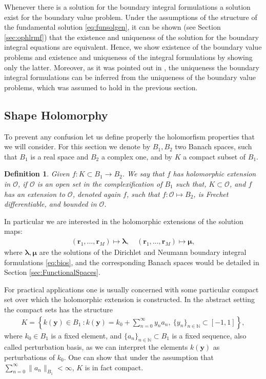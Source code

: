 \documentclass{article}
\newtheorem{definition}[theorem]{Definition}
\newcommand{\cO}{\mathcal O}
\newcommand{\bmu} {\bm{\mu}}
\newcommand{\IN}{{\mathbb N}}
\newcommand{\bla}{\boldsymbol \lambda}
\newcommand{\br}{\bm{r}}
\newcommand{\by}{\bm{y}}
\begin{document}
Whenever there is a solution for the boundary integral formulations a solution exist for the boundary value problem. Under the assumptions of the 
structure of the fundamental solution \eqref{eq:funsolgen}, it can be shown (see Section \ref{sec:ophlrmf}) that the existence and uniqueness of the solution for the boundary integral equations are equivalent. Hence, we show existence of the boundary value problems and  existence and uniqueness of the integral formulations by showing only  the latter. Moreover, as it was pointed out in \cite{JHP20}, the uniqueness the boundary integral formulations can be inferred from the uniqueness of the boundary value problems, which was assumed to hold in the previous section. 

\subsection{Shape Holomorphy}
\label{section:ShapeHolormsGeneral}

To prevent any confusion let us define properly the holomorfism properties that we will consider. For this section we denote by $B_1,B_2$ two Banach spaces, such that $B_1$ is a real space and $B_2$ a complex one, and by $K$ a compact subset of $B_1$. 

\begin{definition}
\label{def:holmrfextension}
Given $f :K \subset B_1 \rightarrow B_2$. We say that $f$ has holomorphic extension in $\cO$, if $\cO$ is an open set in the complexification of $B_1$ such that, $K \subset \cO$, and $f$ has an extension to $\cO$, denoted again $f$, such that $f : \cO \mapsto B_2$, is Frechet differentiable, and bounded in $\cO$.
\end{definition}

In particular we are interested in the holomorphic extensions of the solution maps: 
\begin{align*}
(\br_1,\hdots,\br_M) \mapsto \bla, \quad (\br_1,\hdots,\br_M) \mapsto \bmu,
\end{align*}
where $\bla,\bmu$ are the solutions of the Dirichlet and Neumann boundary integral formulations \eqref{eq:bios}, and the corresponding Banach spaces would be detailed in Section \ref{sec:FunctionalSpaces}.

For practical applications one is usually concerned with some particular compact set over which the holomorphic extension is constructed. In the abstract setting the compact sets has the structure 
\begin{align}
\label{eq:Kcompact}
K =\left\lbrace k(\by) \in B_1 \ : k(\by) = k_0 + \sum_{n=0}^\infty y_n a_n, \ \{y_n\}_{n \in \IN} \subset [-1,1] \right\rbrace,
\end{align}
where $k_0 \in B_1$ is a fixed element, and $\{a_n\}_{n\in \IN} \subset B_1$ is  a fixed sequence, also called perturbation basis, as we can interpret the elements $k(\by)$ as perturbations of $k_0$. One can show that under the assumption that $\sum_{n=0}^\infty \|a_n\|_{B_1} < \infty$, $K$ is in fact compact. 
\end{document}
